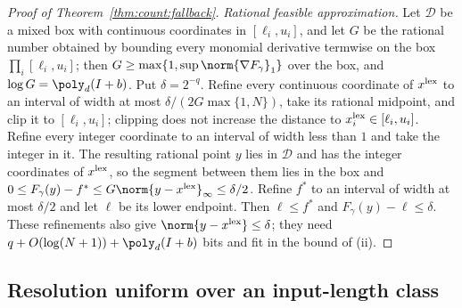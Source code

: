 \begin{proof}[Proof of Theorem~\ref{thm:count:fallback}]
\emph{Rational feasible approximation.} Let $\mathcal D$ be a mixed box with
continuous coordinates in $[\ell_i,u_i]$, and let $G$ be the rational number
obtained by bounding every monomial derivative termwise on the box
$\prod_i[\ell_i,u_i]$; then $G\ge\max\{1,\sup\norm{\nabla F_\gamma}_1\}$ over the
box, and $\log G=\poly_d(I+b)$. Put $\delta=2^{-q}$. Refine every continuous
coordinate of $x^{\rm lex}$ to an interval of width at most
$\delta/(2G\max\{1,N\})$,
take its rational midpoint, and clip it to $[\ell_i,u_i]$; clipping does not
increase the distance to $x_i^{\rm lex}\in[\ell_i,u_i]$. Refine every integer
coordinate to an interval of width less than $1$ and take the integer in it.
The resulting rational point $y$ lies in $\mathcal D$ and has the integer
coordinates of $x^{\rm lex}$, so the segment between them lies in the box and
$0\le F_\gamma(y)-f^*\le G\norm{y-x^{\rm lex}}_\infty\le\delta/2$. Refine
$f^*$ to an interval of width at most $\delta/2$ and let $\ell$ be its lower
endpoint. Then $\ell\le f^*$ and $F_\gamma(y)-\ell\le\delta$. These refinements
also give $\norm{y-x^{\rm lex}}\le\delta$; they need
$q+O(\log(N+1))+\poly_d(I+b)$ bits and fit in the bound of (ii).
\end{proof}

\subsection{Resolution uniform over an input-length class}\label{app:count:universal}

